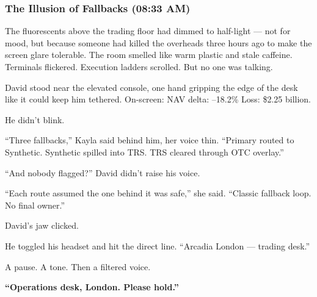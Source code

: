 \subsubsection{The Illusion of Fallbacks (08:33 AM)} 
The fluorescents above the trading floor had dimmed to half-light — not for mood, but because someone had 
killed the overheads three hours ago to make the screen glare tolerable. The room smelled like warm plastic and stale caffeine. Terminals flickered. Execution ladders scrolled. But no one was talking.

David stood near the elevated console, one hand gripping the edge of the desk like it could keep him tethered. On-screen:
NAV delta: –18.2\%
Loss: \$2.25 billion.

He didn’t blink.

“Three fallbacks,” Kayla said behind him, her voice thin. “Primary routed to Synthetic. Synthetic spilled into TRS. 
TRS cleared through OTC overlay.”

“And nobody flagged?” David didn’t raise his voice.

“Each route assumed the one behind it was safe,” she said. “Classic fallback loop. No final owner.”

David’s jaw clicked.

He toggled his headset and hit the direct line. “Arcadia London — trading desk.”

A pause. A tone. Then a filtered voice.

\textbf{“Operations desk, London. Please hold.”}


